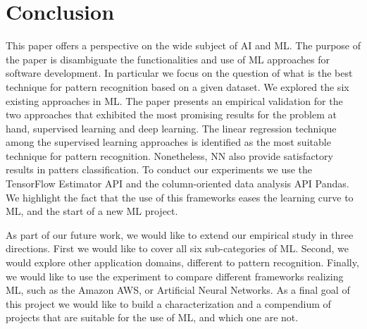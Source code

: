 
\section{Conclusion}
\label{sec:conclusion}

This paper offers a perspective on the wide subject of \ac{AI} and \ac{ML}. The purpose of the paper 
is disambiguate the functionalities and use of \ac{ML} approaches for software development. In particular 
we focus on the question of what is the best technique for pattern recognition based on a given 
dataset. We explored the six existing approaches in \ac{ML}. The paper presents an empirical 
validation for the two approaches that exhibited the most promising results for the problem at hand, 
supervised learning and deep learning. The linear regression technique among the supervised 
learning approaches is identified as the most suitable technique for pattern recognition. Nonetheless, 
\acl{NN} also provide satisfactory results in patters classification. 
To conduct our experiments we use the TensorFlow Estimator API and the column-oriented data 
analysis API Pandas. We highlight the fact that the use of this frameworks eases the learning curve 
to \ac{ML}, and the start of a new \ac{ML} project.

As part of our future work, we would like to extend our empirical study in three directions. First we 
would like to cover all six sub-categories of \ac{ML}. Second, we would explore other application 
domains, different to pattern recognition. Finally, we would like to use the experiment to compare 
different frameworks realizing \ac{ML}, such as the Amazon AWS, or Artificial Neural Networks. 
As a final goal of this project we would like to build a characterization and a compendium of projects 
that are suitable for the use of \ac{ML}, and which one are not.

\endinput

